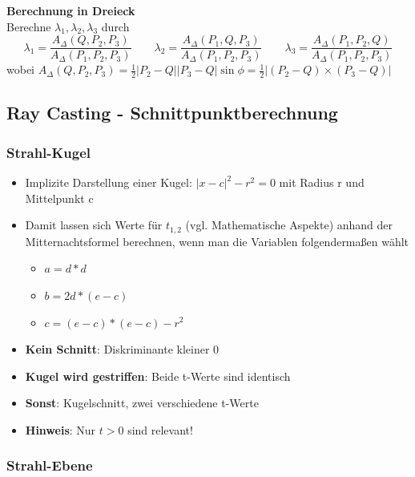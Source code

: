 \documentclass[10pt,a4paper]{article}
\begin{document}
        \textbf{Berechnung in Dreieck}\\
        Berechne $\lambda_1, \lambda_2, \lambda_3$ durch \\
        $$\lambda_1 = \frac{A_{\Delta}(Q, P_2, P_3)}{A_\Delta(P_1, P_2, P_3)} \qquad \lambda_2 = \frac{A_{\Delta}(P_1, Q, P_3)}{A_\Delta(P_1, P_2, P_3)} \qquad \lambda_3 = \frac{A_{\Delta}(P_1, P_2, Q)}{A_\Delta(P_1, P_2, P_3)}$$
        wobei $A_\Delta (Q, P_2, P_3) = \frac{1}{2} |P_2 - Q| | P_3 - Q | \sin \phi = \frac{1}{2} | (P_2 - Q) \times (P_3 - Q) |$
          
	\newpage
	\subsection{Ray Casting - Schnittpunktberechnung}
	\label{rt:sub:ray_casting_schnittpunktberechnung}

	\subsubsection{Strahl-Kugel}
	\label{rt:ssub:strahl_kugel}

	\begin{itemize}
		\item Implizite Darstellung einer Kugel: $|x - c|^2 - r^2 = 0$ mit Radius r und Mittelpunkt c
		\item Damit lassen sich Werte für $t_{1,2}$ (vgl. Mathematische Aspekte) anhand der Mitternachtsformel berechnen, wenn man die Variablen folgendermaßen wählt
		\begin{itemize}
			\item $a = d * d$
			\item $b = 2d * (e - c)$
			\item $c = (e - c) * (e - c) - r^2$
		\end{itemize}
		\item \textbf{Kein Schnitt}: Diskriminante kleiner 0
		\item \textbf{Kugel wird gestriffen}: Beide t-Werte sind identisch
		\item \textbf{Sonst}: Kugelschnitt, zwei verschiedene t-Werte
		\item \textbf{Hinweis}: Nur $t > 0$ sind relevant!
	\end{itemize}

	\subsubsection{Strahl-Ebene}
	\label{rt:ssub:strahl_ebene}
	
\end{document}
